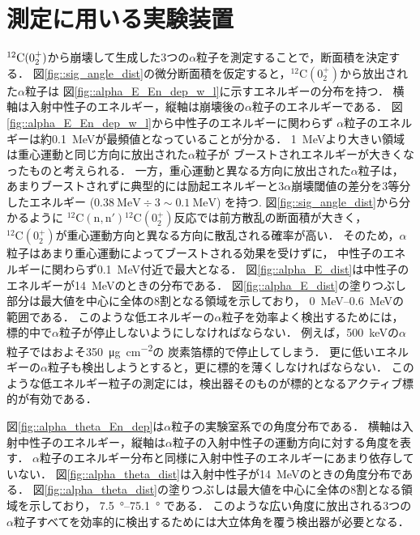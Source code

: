 \documentclass[../master]{subfiles}
\begin{document}
\section{測定に用いる実験装置}
\label{seq::detector_using_experiment}
${}^{12}{\rm C} (0_2^+)$から崩壊して生成した3つの$\alpha$粒子を測定することで，断面積を決定する．
図\ref{fig::sig_angle_dist}の微分断面積を仮定すると，${}^{12}\mathrm{C} (0_2^+)$から放出された$\alpha$粒子は
図\ref{fig::alpha_E_En_dep_w_l}に示すエネルギーの分布を持つ．
横軸は入射中性子のエネルギー，縦軸は崩壊後の$\alpha$粒子のエネルギーである．
図\ref{fig::alpha_E_En_dep_w_l}から中性子のエネルギーに関わらず
$\alpha$粒子のエネルギーは約\SI{0.1}{\mega\electronvolt}が最頻値となっていることが分かる．
\SI{1}{\mega\electronvolt}より大きい領域は重心運動と同じ方向に放出された$\alpha$粒子が
ブーストされエネルギーが大きくなったものと考えられる．
一方，重心運動と異なる方向に放出された$\alpha$粒子は，
あまりブーストされずに典型的には励起エネルギーと3$\alpha$崩壊閾値の差分を3等分したエネルギー
($\SI{0.38}{\mega\electronvolt}\div 3 \sim \SI{0.1}{\mega\electronvolt}$) を持つ.
図\ref{fig::sig_angle_dist}から分かるように
${}^{12}\mathrm{C}(\mathrm{n},\mathrm{n}'){}^{12}\mathrm{C}(0_2^+)$反応では前方散乱の断面積が大きく，
${}^{12}\mathrm{C} (0_2^+)$が重心運動方向と異なる方向に散乱される確率が高い．
そのため，$\alpha$粒子はあまり重心運動によってブーストされる効果を受けずに，
中性子のエネルギーに関わらず\SI{0.1}{\mega\electronvolt}付近で最大となる．
図\ref{fig::alpha_E_dist}は中性子のエネルギーが\SI{14}{\mega\electronvolt}のときの分布である．
図\ref{fig::alpha_E_dist}の塗りつぶし部分は最大値を中心に全体の8割となる領域を示しており，
\SIrange{0}{0.6}{\mega\electronvolt}の範囲である．
このような低エネルギーの$\alpha$粒子を効率よく検出するためには，
標的中で$\alpha$粒子が停止しないようにしなければならない．
例えば，\SI{500}{\kilo\electronvolt}の$\alpha$粒子ではおよそ\SI{350}{\micro\gram\per\square\centi\metre}の
炭素箔標的で停止してしまう．
更に低いエネルギーの$\alpha$粒子も検出しようとすると，更に標的を薄くしなければならない．
このような低エネルギー粒子の測定には，検出器そのものが標的となるアクティブ標的が有効である．

図\ref{fig::alpha_theta_En_dep}は$\alpha$粒子の実験室系での角度分布である．
横軸は入射中性子のエネルギー，縦軸は$\alpha$粒子の入射中性子の運動方向に対する角度を表す．
$\alpha$粒子のエネルギー分布と同様に入射中性子のエネルギーにあまり依存していない．
図\ref{fig::alpha_theta_dist}は入射中性子が\SI{14}{\mega\electronvolt}のときの角度分布である．
図\ref{fig::alpha_theta_dist}の塗りつぶしは最大値を中心に全体の8割となる領域を示しており，
\SIrange{7.5}{75.1}{\degree} である．
このような広い角度に放出される3つの$\alpha$粒子すべてを効率的に検出するためには大立体角を覆う検出器が必要となる．
\end{document}
